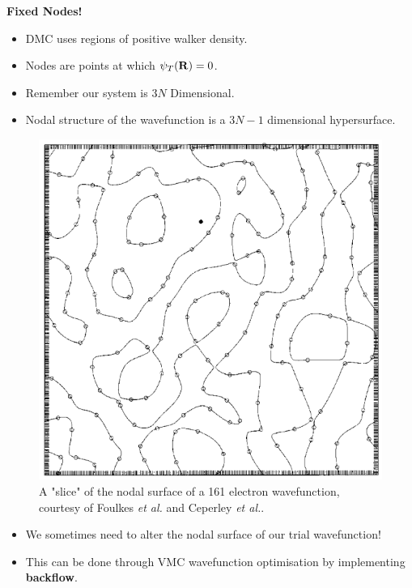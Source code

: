 \documentclass[10pt]{beamer}
\begin{document}
\begin{frame}[allowframebreaks]
    \textbf{Fixed Nodes!}
    \begin{itemize}
        \item[\textbullet] DMC uses regions of positive walker density.
        \item[\textbullet] Nodes are points at which $\psi_T\pqty{\vb{R}}=0$.
        \item[\textbullet] Remember our system is $3N$ Dimensional.
        \item[\textbullet] Nodal structure of the wavefunction is a $3N-1$
        dimensional hypersurface.
    \end{itemize}
    \framebreak

    \begin{figure}
        \includegraphics[scale=0.22]{./images/nodal-surface-slice.png}
        \caption{
            A "slice" of the nodal surface of a 161 electron wavefunction,
            courtesy of Foulkes \textit{et al.}\cite{Foulkes2001} and Ceperley \textit{et al.}.
        }
    \end{figure}
    \framebreak

    \begin{itemize}
        \item[\textbullet] We sometimes need to alter the nodal surface of our
        trial wavefunction!
        \item[\textbullet] This can be done through VMC wavefunction
            optimisation by implementing \textbf{backflow}.
    \end{itemize}

\end{frame}
\end{document}
